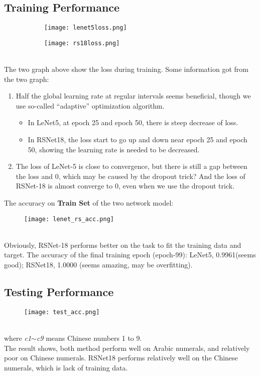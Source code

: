 \documentclass{article}
\begin{document}
\subsection{Training Performance}
\begin{figure}[htb]
\begin{minipage}[b]{0.48\linewidth}
\begin{figure}[H]
\centering
\texttt{[image: lenet5loss.png]}
\end{figure}
\end{minipage}
\begin{minipage}[b]{0.48\linewidth}
\begin{figure}[H]
\centering
\texttt{[image: rs18loss.png]}
\end{figure}
\end{minipage}
\end{figure}
~\\
The two graph above show the loss during training. Some information got from the two graph:
\begin{enumerate}
    \item Half the global learning rate at regular intervals seems beneficial, though we use so-called ``adaptive'' optimization algorithm.
        \begin{itemize}
            \item In LeNet5, at epoch 25 and epoch 50, there is steep decrease of loss.
            \item In RSNet18, the loss start to go up and down near epoch 25 and epoch 50, showing the learning rate is needed to be decreased.
        \end{itemize}
    \item The loss of LeNet-5 is close to convergence, but there is still a gap between the loss and 0, which may be caused by the dropout trick? And the loss of RSNet-18 is almost converge to 0, even when we use the dropout trick.
\end{enumerate}
The accuracy on \textbf{Train Set} of the two network model:
\begin{figure}[H]
\centering
\texttt{[image: lenet\_rs\_acc.png]}
\end{figure}
~\\
Obviously, RSNet-18 performs better on the task to fit the training data and target.
The accuracy of the final training epoch (epoch-99): LeNet5, 0.9961(seems good); RSNet18, 1.0000 (seems amazing, may be overfitting).
\subsection{Testing Performance}
\begin{figure}[H]
\centering
\texttt{[image: test\_acc.png]}
\end{figure}
~\\
where \emph{c1$\sim$c9} means Chinese numbers 1 to 9.\\
The result shows, both method perform well on Arabic numerals, and relatively poor on Chinese numerals. RSNet18 performs relatively well on the Chinese numerals, which is lack of training data.
\end{document}
